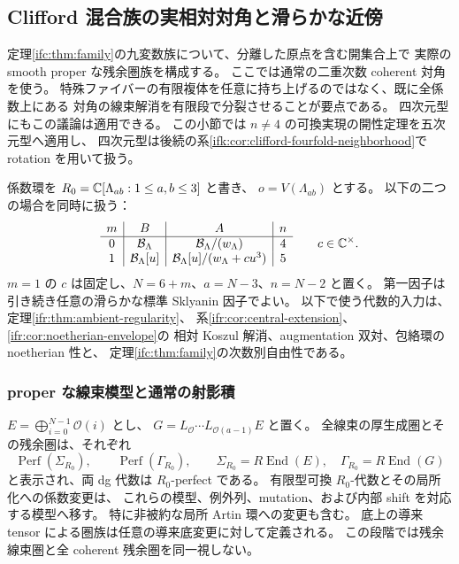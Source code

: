 \subsection{Clifford 混合族の実相対対角と滑らかな近傍}
\label{iff:subsec:smoothness}

定理\ref{ifc:thm:family}の九変数族について、分離した原点を含む開集合上で
実際の smooth proper な残余圏族を構成する。
ここでは通常の二重次数 coherent 対角を使う。
特殊ファイバーの有限複体を任意に持ち上げるのではなく、既に全係数上にある
対角の線束解消を有限段で分裂させることが要点である。
四次元型にもこの議論は適用できる。
この小節では $n\ne4$ の可換実現の開性定理を五次元型へ適用し、
四次元型は後続の系\ref{ifk:cor:clifford-fourfold-neighborhood}で
rotation を用いて扱う。

係数環を $R_0=\mathbb C[\Lambda_{ab}:1\leq a,b\leq3]$ と書き、
$o=V(\Lambda_{ab})$ とする。
以下の二つの場合を同時に扱う：
\begin{equation}\label{iff:eq:families}
 \begin{array}{c|c|c|c}
  m&B&A&n\\ \hline
  0&\mathcal B_\Lambda&\mathcal B_\Lambda/(w_\Lambda)&4\\
  1&\mathcal B_\Lambda[u]&
      \mathcal B_\Lambda[u]/(w_\Lambda+cu^3)&5
 \end{array}
 \qquad c\in\mathbb C^\times .
\end{equation}
$m=1$ の $c$ は固定し、$N=6+m$、$a=N-3$、$n=N-2$ と置く。
第一因子は引き続き任意の滑らかな標準 Sklyanin 因子でよい。
以下で使う代数的入力は、定理\ref{ifr:thm:ambient-regularity}、
系\ref{ifr:cor:central-extension}、\ref{ifr:cor:noetherian-envelope}の
相対 Koszul 解消、augmentation 双対、包絡環の noetherian 性と、
定理\ref{ifc:thm:family}の次数別自由性である。

\subsubsection{proper な線束模型と通常の射影積}

\begin{proposition}[有限線束模型と係数変更]
\label{iff:prop:proper-model}
$E=\bigoplus_{i=0}^{N-1}\mathcal O(i)$ とし、
$G=L_{\mathcal O}\cdots L_{\mathcal O(a-1)}E$ と置く。
全線束の厚生成圏とその残余圏は、それぞれ
\[
 \operatorname{Perf}(\Sigma_{R_0}),\qquad
 \operatorname{Perf}(\Gamma_{R_0}),\qquad
 \Sigma_{R_0}=R\operatorname{End}(E),\quad
 \Gamma_{R_0}=R\operatorname{End}(G)
\]
と表示され、両 dg 代数は $R_0$-perfect である。
有限型可換 $R_0$-代数とその局所化への係数変更は、
これらの模型、例外列、mutation、および内部 shift を対応する模型へ移す。
特に非被約な局所 Artin 環への変更も含む。
底上の導来 tensor による圏族は任意の導来底変更に対して定義される。
この段階では残余線束圏と全 coherent 残余圏を同一視しない。
\end{proposition}

